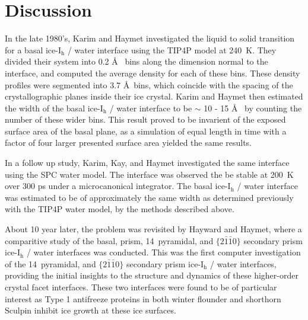 \section{Discussion}
In the late 1980's, Karim and Haymet investigated the liquid to solid
transition for a basal ice-I$_\mathrm{h}$ / water interface using the
TIP4P model at 240~K.\cite{Karim1987,Karim1988} They divided their
system into 0.2 \AA~ bins along the dimension normal to the interface,
and computed the average density for each of these bins. These density
profiles were segmented into 3.7 \AA~bins, which coincide with the
spacing of the crystallographic planes inside their ice crystal. Karim
and Haymet then estimated the width of the basal ice-I$_\mathrm{h}$ /
water interface to be $\sim$ 10 - 15 \AA~ by counting the number of
these wider bins. This result proved to be invarient of the exposed
surface area of the basal plane, as a simulation of equal length in
time with a factor of four larger presented surface area yielded the
same results.

In a follow up study, Karim, Kay, and Haymet investigated the same
interface using the SPC water model.\cite{Karim1990} The interface was
observed the be stable at 200~K over 300 ps under a microcanonical
integrator. The basal ice-I$_\mathrm{h}$ / water interface was
estimated to be of approximately the same width as determined
previously with the TIP4P water model, by the methods described
above. 

About 10 year later, the problem was revisited by Hayward and Haymet,
where a comparitive study of the basal, prism, 14\degree~pyramidal,
and $\{2\bar{1}\bar{1}0\}$ secondary prism ice-I$_\mathrm{h}$ / water
interfaces was conducted.\cite{Hayward2001} This was the
first computer investigation of the 14\degree~pyramidal, and
$\{2\bar{1}\bar{1}0\}$ secondary prism ice-I$_\mathrm{h}$ / water
interfaces, providing the initial insights to the structure and
dynamics of these higher-order crystal facet interfaces. These two
interfaces were found to be of particular interest as Type 1
antifreeze proteins in both winter flounder and shorthorn Sculpin
inhibit ice growth at these ice
surfaces.\cite{Knight2001,Wierzbicki1996,Haymet1998,Harding1999}

